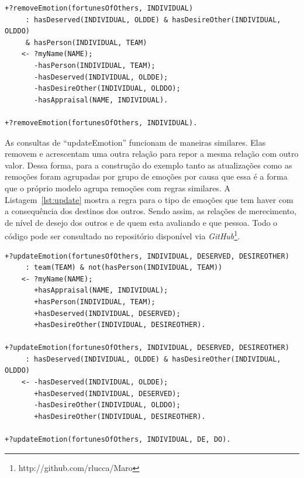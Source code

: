 \begin{center}
    \begin{minipage}{130mm}
	\lstset{linewidth=130mm}
	\begin{lstlisting}[frame=trbl,
caption=Amostra de remoção de emoção do tipo destino de outros,
label=lst:removeSample]
+?removeEmotion(fortunesOfOthers, INDIVIDUAL)
     : hasDeserved(INDIVIDUAL, OLDDE) & hasDesireOther(INDIVIDUAL, OLDDO)
     & hasPerson(INDIVIDUAL, TEAM)
    <- ?myName(NAME);
       -hasPerson(INDIVIDUAL, TEAM);
       -hasDeserved(INDIVIDUAL, OLDDE);
       -hasDesireOther(INDIVIDUAL, OLDDO);
       -hasAppraisal(NAME, INDIVIDUAL).

+?removeEmotion(fortunesOfOthers, INDIVIDUAL).
	\end{lstlisting}
    \end{minipage}
\end{center}

As consultas de ``updateEmotion'' funcionam de maneiras similares. Elas
removem e acrescentam uma outra relação para repor a mesma relação com outro
valor. Dessa forma, para a construção do exemplo tanto as atualizações como as
remoções foram agrupadas por grupo de emoções por causa que essa é a forma que
o próprio modelo agrupa remoções com regras similares. A Listagem~\ref{lst:update}
mostra a regra para o tipo de emoções que tem haver com a consequência dos
destinos dos outros. Sendo assim, as relações de merecimento, de nível de
desejo dos outros e de quem esta avaliando e que pessoa. Todo o código pode
ser consultado no repositório disponível via
\emph{GitHub}\footnote{http://github.com/rlucca/Maro}.

\begin{center}
    \begin{minipage}{130mm}
	\lstset{linewidth=130mm}
	\begin{lstlisting}[frame=trbl,
caption=Amostra de código referente as atualizações de emoções do tipo destino de outros,
label=lst:update]
+?updateEmotion(fortunesOfOthers, INDIVIDUAL, DESERVED, DESIREOTHER)
     : team(TEAM) & not(hasPerson(INDIVIDUAL, TEAM))
    <- ?myName(NAME);
       +hasAppraisal(NAME, INDIVIDUAL);
       +hasPerson(INDIVIDUAL, TEAM);
       +hasDeserved(INDIVIDUAL, DESERVED);
       +hasDesireOther(INDIVIDUAL, DESIREOTHER).

+?updateEmotion(fortunesOfOthers, INDIVIDUAL, DESERVED, DESIREOTHER)
     : hasDeserved(INDIVIDUAL, OLDDE) & hasDesireOther(INDIVIDUAL, OLDDO)
    <- -hasDeserved(INDIVIDUAL, OLDDE);
       +hasDeserved(INDIVIDUAL, DESERVED);
       -hasDesireOther(INDIVIDUAL, OLDDO);
       +hasDesireOther(INDIVIDUAL, DESIREOTHER).

+?updateEmotion(fortunesOfOthers, INDIVIDUAL, DE, DO).
	\end{lstlisting}
    \end{minipage}
\end{center}
